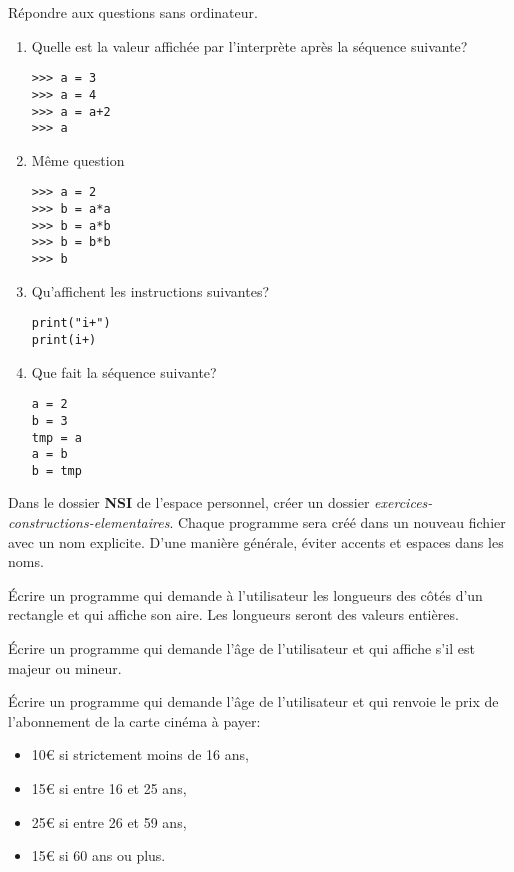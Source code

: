 \documentclass[a4paper,11pt]{article}
\begin{document}
\begin{exo}
Répondre aux questions sans ordinateur.
\begin{enumerate}
\item Quelle est la valeur affichée par l'interprète après la séquence suivante?
\begin{lstlisting}
>>> a = 3
>>> a = 4
>>> a = a+2
>>> a
\end{lstlisting}
\item Même question
\begin{lstlisting}
>>> a = 2
>>> b = a*a
>>> b = a*b
>>> b = b*b
>>> b
\end{lstlisting}
\item Qu'affichent les instructions suivantes?
\begin{lstlisting}
print("i+")
print(i+)
\end{lstlisting}
\item Que fait la séquence suivante?
\begin{lstlisting}
a = 2
b = 3
tmp = a
a = b
b = tmp
\end{lstlisting}
\end{enumerate}
\end{exo}
\begin{framed}
    \centering Dans le dossier \textbf{NSI} de l'espace personnel, créer un dossier \emph{exercices-constructions-elementaires}. Chaque programme sera créé dans un nouveau fichier avec un nom explicite. D'une manière générale, éviter accents et espaces dans les noms.
\end{framed}
\begin{exo}
Écrire un programme qui demande à l'utilisateur les longueurs des côtés d'un rectangle et qui affiche son aire. Les longueurs seront des valeurs entières.
\end{exo}
\begin{exo}
Écrire un programme qui demande l'âge de l'utilisateur et qui affiche s'il est majeur ou mineur.
\end{exo}
\begin{exo}
Écrire un programme qui demande l'âge de l'utilisateur et qui renvoie le prix de l'abonnement de la carte cinéma à payer:
\begin{itemize}
\item 10€ si strictement moins de 16 ans,
\item 15€ si entre 16 et 25 ans,
\item 25€ si entre 26 et 59 ans,
\item 15€ si 60 ans ou plus.
\end{itemize}
\end{exo}
\end{document}
